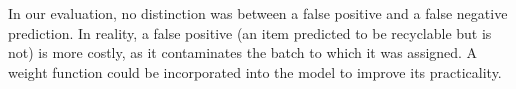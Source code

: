 \documentclass{article}
\begin{document}
In our evaluation, no distinction was between a false positive and a false negative prediction. In reality, a false positive (an item predicted to be recyclable but is not) is more costly, as it contaminates the batch to which it was assigned. A weight function could be incorporated into the model to improve its practicality.


\end{document}
